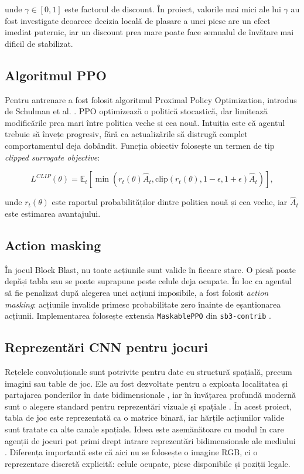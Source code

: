 \documentclass[12pt,a4paper]{article}
\begin{document}
unde $\gamma \in [0,1]$ este factorul de discount. În proiect, valorile mai mici ale lui $\gamma$ au fost investigate deoarece decizia locală de plasare a unei piese are un efect imediat puternic, iar un discount prea mare poate face semnalul de învățare mai dificil de stabilizat.

\subsection{Algoritmul PPO}

Pentru antrenare a fost folosit algoritmul Proximal Policy Optimization, introdus de Schulman et al. \cite{schulman2017ppo}. PPO optimizează o politică stocastică, dar limitează modificările prea mari între politica veche și cea nouă. Intuiția este că agentul trebuie să învețe progresiv, fără ca actualizările să distrugă complet comportamentul deja dobândit. Funcția obiectiv folosește un termen de tip \textit{clipped surrogate objective}:

\begin{equation}
    L^{CLIP}(\theta) =
    \mathbb{E}_t
    \left[
        \min
        \left(
            r_t(\theta) \hat{A}_t,
            \text{clip}(r_t(\theta), 1-\epsilon, 1+\epsilon)\hat{A}_t
        \right)
    \right],
\end{equation}

unde $r_t(\theta)$ este raportul probabilităților dintre politica nouă și cea veche, iar $\hat{A}_t$ este estimarea avantajului.

\subsection{Action masking}

În jocul Block Blast, nu toate acțiunile sunt valide în fiecare stare. O piesă poate depăși tabla sau se poate suprapune peste celule deja ocupate. În loc ca agentul să fie penalizat după alegerea unei acțiuni imposibile, a fost folosit \textit{action masking}: acțiunile invalide primesc probabilitate zero înainte de eșantionarea acțiunii. Implementarea folosește extensia \texttt{MaskablePPO} din \texttt{sb3-contrib} \cite{sb3contrib}.

\subsection{Reprezentări CNN pentru jocuri}

Rețelele convoluționale sunt potrivite pentru date cu structură spațială, precum imagini sau table de joc. Ele au fost dezvoltate pentru a exploata localitatea și partajarea ponderilor în date bidimensionale \cite{lecun1998gradient}, iar în învățarea profundă modernă sunt o alegere standard pentru reprezentări vizuale și spațiale \cite{goodfellow2016deep}. În acest proiect, tabla de joc este reprezentată ca o matrice binară, iar hărțile acțiunilor valide sunt tratate ca alte canale spațiale. Ideea este asemănătoare cu modul în care agenții de jocuri pot primi drept intrare reprezentări bidimensionale ale mediului \cite{mnih2015dqn}. Diferența importantă este că aici nu se folosește o imagine RGB, ci o reprezentare discretă explicită: celule ocupate, piese disponibile și poziții legale.
\end{document}
